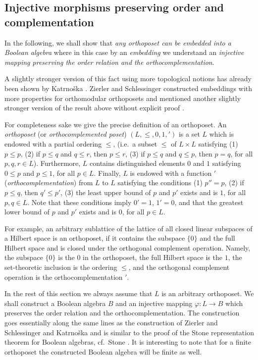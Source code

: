 \subsection{Injective morphisms preserving order and complementation}
\label{section:2.3}


In the following, we shall show that {\em any orthoposet
can be embedded into a Boolean algebra} where in this case
by an {\em embedding} we understand  an {\em injective mapping
preserving the order relation and the orthocomplementation}.

A slightly stronger version of this fact using
more topological notions has already been shown by
Katrno\v{s}ka \cite{katrnoska-82}.
Zierler and Schlessinger constructed embeddings
with more properties for
orthomodular orthoposets \cite[Theorem 2.1]{ZirlSchl-65}
and mentioned another slightly
stronger version of the result above without explicit proof
\cite[Section 2, Remark 2]{ZirlSchl-65}.

For completeness sake we give the precise definition
of an orthoposet.
An {\em orthoposet} (or {\em orthocomplemented poset})
$(L,\leq,0,1,')$ is a set $L$ which is
endowed with a partial ordering
$\leq$, (i.e.\ a subset $\leq$ of $L \times L$ satisfying
(1) $p \leq p$, (2) if $p \leq q$ and $q \leq r$, then
$p \leq r$, (3) if $p \leq q$ and $q \leq p$, then $p=q$,
for all $p,q,r \in L$). Furthermore, $L$
contains distinguished elements $0$ and $1$ satisfying
$0 \leq p$ and $p \leq 1$, for all $p \in L$.
Finally, $L$ is endowed with a function $'$
({\em orthocomplementation}) from $L$ to $L$ satisfying the
conditions (1) $p''=p$, (2) if $p \leq q$, then $q' \leq p'$,
(3) the least upper bound of $p$ and $p'$ exists and is $1$,
for all $p,q \in L$.
Note that these conditions imply $0'=1$, $1'=0$, and that the greatest
lower bound
of $p$ and $p'$ exists and is $0$, for all $p \in L$.

For example,
an arbitrary sublattice of the lattice of all closed linear subspaces of a
Hilbert space is an orthoposet, if it contains the
subspace $\{0\}$  and the full Hilbert space and is closed under the
orthogonal complement operation.
Namely, the subspace $\{0\}$ is the $0$ in the orthoposet, the full Hilbert
space
is the $1$, the set-theoretic inclusion is the ordering $\leq$,
and the orthogonal complement operation is the orthocomplementation $'$.

In the rest of this section we always assume that $L$ is an
arbitrary orthoposet.
We shall construct a Boolean algebra $B$ and an injective
mapping $\varphi:L\rightarrow B$ which preserves the order
relation and the orthocomplementation.
The construction goes essentially along the same lines as the
construction of Zierler and Schlessinger \cite{ZirlSchl-65}
and Katrno\v{s}ka \cite{katrnoska-82} and is similar to the
proof of the Stone representation theorem for Boolean algebras, cf.\ Stone
\cite{stone}.
It is interesting to note that for a finite orthoposet
the constructed Boolean algebra will be finite as well.



